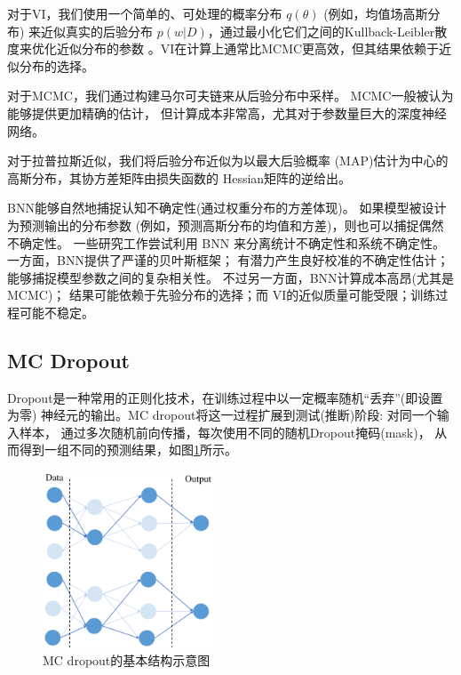 对于VI，我们使用一个简单的、可处理的概率分布
$q(\theta)$ (例如，均值场高斯分布) 来近似真实的后验分布
$p(w|D)$，通过最小化它们之间的Kullback-Leibler散度\cite{1320776d-9e76-337e-a755-73010b6e4b64}来优化近似分布的参数
。VI在计算上通常比MCMC更高效，但其结果依赖于近似分布的选择。

对于MCMC，我们通过构建马尔可夫链来从后验分布中采样。
MCMC一般被认为能够提供更加精确的估计，
但计算成本非常高，尤其对于参数量巨大的深度神经网络。

对于拉普拉斯近似，我们将后验分布近似为以最大后验概率
(MAP)估计为中心的高斯分布，其协方差矩阵由损失函数的
Hessian矩阵的逆给出。

BNN能够自然地捕捉认知不确定性(通过权重分布的方差体现)。
如果模型被设计为预测输出的分布参数
(例如，预测高斯分布的均值和方差)，则也可以捕捉偶然不确定性。
一些研究工作尝试利用 BNN 来分离统计不确定性和系统不确定性。
一方面，BNN提供了严谨的贝叶斯框架；
有潜力产生良好校准的不确定性估计；
能够捕捉模型参数之间的复杂相关性。
不过另一方面，BNN计算成本高昂(尤其是MCMC)；
结果可能依赖于先验分布的选择；而
VI的近似质量可能受限；训练过程可能不稳定。

\subsection{MC Dropout}

Dropout是一种常用的正则化技术，在训练过程中以一定概率随机“丢弃”(即设置为零)
神经元的输出。MC dropout将这一过程扩展到测试(推断)阶段: 对同一个输入样本，
通过多次随机前向传播，每次使用不同的随机Dropout掩码(mask)，
从而得到一组不同的预测结果，如图\ref{mc_dropout}所示。


\begin{figure}[htbp]
    \centering
    \includegraphics[width=0.45\textwidth]{figures/MonteCarloDropout.pdf}
    \caption{MC dropout的基本结构示意图\cite{DBLP:journals/corr/abs-2011-06225}}
    \label{mc_dropout}
\end{figure}

